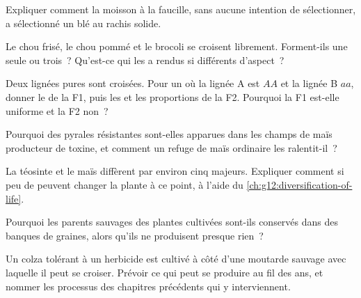 \begin{exercise}[$\star\star$]\label{exo:g12:domesticated-plants:6}
Expliquer comment la moisson à la faucille, sans aucune intention de
sélectionner, a sélectionné un blé au rachis solide.
\end{exercise}

\begin{exercise}[$\star\star$]\label{exo:g12:domesticated-plants:7}
Le chou frisé, le chou pommé et le brocoli se croisent librement.
Forment-ils une seule  ou trois~? Qu'est-ce qui les a rendus si
différents d'aspect~?
\end{exercise}

\begin{exercise}[$\star\star$]\label{exo:g12:domesticated-plants:8}
Deux lignées pures sont croisées. Pour un  où la lignée A est
$AA$ et la lignée B $aa$, donner le  de la F1, puis les
 et les proportions de la F2. Pourquoi la F1 est-elle
uniforme et la F2 non~?
\end{exercise}

\begin{exercise}[$\star\star$]\label{exo:g12:domesticated-plants:9}
Pourquoi des pyrales résistantes sont-elles apparues dans les champs
de maïs producteur de toxine, et comment un refuge de maïs ordinaire
les ralentit-il~?
\end{exercise}

\begin{exercise}[$\star\star$]\label{exo:g12:domesticated-plants:10}
La téosinte et le maïs diffèrent par environ cinq  majeurs.
Expliquer comment si peu de  peuvent changer la plante à ce
point, à l'aide du \cref{ch:g12:diversification-of-life}.
\end{exercise}

\begin{exercise}[$\star\star$]\label{exo:g12:domesticated-plants:11}
Pourquoi les parents sauvages des plantes cultivées sont-ils conservés
dans des banques de graines, alors qu'ils ne produisent presque rien~?
\end{exercise}

\begin{exercise}[$\star\star\star$]\label{exo:g12:domesticated-plants:12}
Un colza tolérant à un herbicide est cultivé à côté d'une moutarde
sauvage avec laquelle il peut se croiser. Prévoir ce qui peut se
produire au fil des ans, et nommer les processus des chapitres
précédents qui y interviennent.
\end{exercise}

